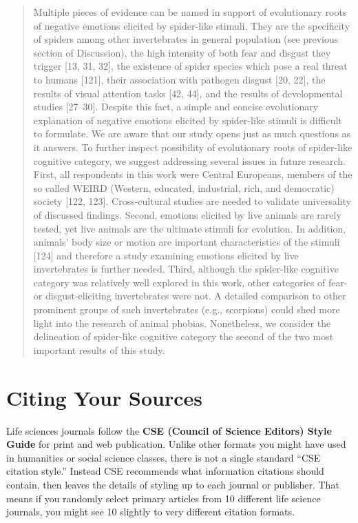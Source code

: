 \documentclass[
]{book}
\begin{document}
\begin{quote}
Multiple pieces of evidence can be named in support of evolutionary roots of negative emotions elicited by spider-like stimuli. They are the specificity of spiders among other invertebrates in general population (see previous section of Discussion), the high intensity of both fear and disgust they trigger {[}13, 31, 32{]}, the existence of spider species which pose a real threat to humans {[}121{]}, their association with pathogen disgust {[}20, 22{]}, the results of visual attention tasks {[}42, 44{]}, and the results of developmental studies {[}27--30{]}. Despite this fact, a simple and concise evolutionary explanation of negative emotions elicited by spider-like stimuli is difficult to formulate. We are aware that our study opens just as much questions as it answers. To further inspect possibility of evolutionary roots of spider-like cognitive category, we suggest addressing several issues in future research. First, all respondents in this work were Central Europeans, members of the so called WEIRD (Western, educated, industrial, rich, and democratic) society {[}122, 123{]}. Cross-cultural studies are needed to validate universality of discussed findings. Second, emotions elicited by live animals are rarely tested, yet live animals are the ultimate stimuli for evolution. In addition, animals' body size or motion are important characteristics of the stimuli {[}124{]} and therefore a study examining emotions elicited by live invertebrates is further needed. Third, although the spider-like cognitive category was relatively well explored in this work, other categories of fear- or disgust-eliciting invertebrates were not. A detailed comparison to other prominent groups of such invertebrates (e.g., scorpions) could shed more light into the research of animal phobias. Nonetheless, we consider the delineation of spider-like cognitive category the second of the two most important results of this study.
\end{quote}

\hypertarget{citformats510}{%
\chapter{Citing Your Sources}\label{citformats510}}

Life sciences journals follow the \textbf{CSE (Council of Science Editors) Style Guide} for print and web publication. Unlike other formats you might have used in humanities or social science classes, there is not a single standard ``CSE citation style.'' Instead CSE recommends what information citations should contain, then leaves the details of styling up to each journal or publisher. That means if you randomly select primary articles from 10 different life science journals, you might see 10 slightly to very different citation formats.
\end{document}

